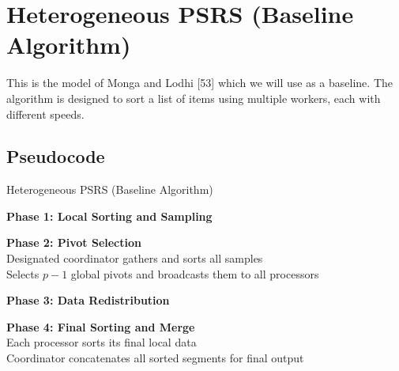 \documentclass[]{interact}
\theoremstyle{plain}
\theoremstyle{definition}
\theoremstyle{remark}
\begin{document}
\section{Heterogeneous PSRS (Baseline Algorithm)}

This is the model of Monga and Lodhi [53] which we will use as a baseline. The algorithm is designed to sort a list of items using multiple workers, each with different speeds.

\subsection{Pseudocode}

\begin{algorithm}[H]
\caption{Heterogeneous PSRS (Baseline Algorithm)}

\textbf{Phase 1: Local Sorting and Sampling} \\

\textbf{Phase 2: Pivot Selection} \\
Designated coordinator gathers and sorts all samples \\
Selects $p - 1$ global pivots and broadcasts them to all processors

\textbf{Phase 3: Data Redistribution} \\

\textbf{Phase 4: Final Sorting and Merge} \\
Each processor sorts its final local data \\
Coordinator concatenates all sorted segments for final output
\end{algorithm}
\end{document}
